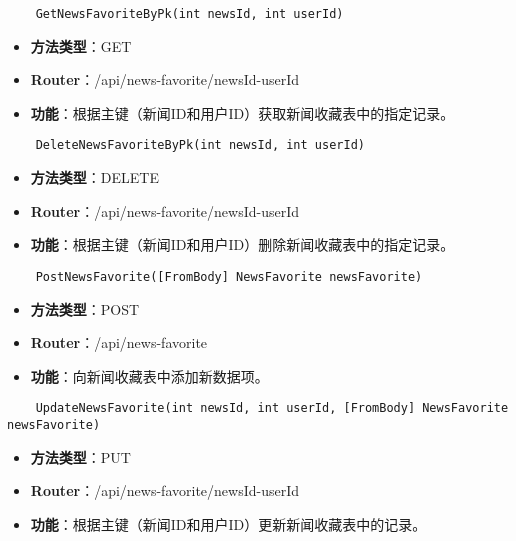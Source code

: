 \begin{verbatim}
	GetNewsFavoriteByPk(int newsId, int userId)
\end{verbatim}

\begin{itemize}
	\item \textbf{方法类型}：GET
	\item \textbf{Router}：/api/news-favorite/{newsId}-{userId}
	\item \textbf{功能}：根据主键（新闻ID和用户ID）获取新闻收藏表中的指定记录。
\end{itemize}

\begin{verbatim}
	DeleteNewsFavoriteByPk(int newsId, int userId)
\end{verbatim}

\begin{itemize}
	\item \textbf{方法类型}：DELETE
	\item \textbf{Router}：/api/news-favorite/{newsId}-{userId}
	\item \textbf{功能}：根据主键（新闻ID和用户ID）删除新闻收藏表中的指定记录。
\end{itemize}

\begin{verbatim}
	PostNewsFavorite([FromBody] NewsFavorite newsFavorite)
\end{verbatim}

\begin{itemize}
	\item \textbf{方法类型}：POST
	\item \textbf{Router}：/api/news-favorite
	\item \textbf{功能}：向新闻收藏表中添加新数据项。
\end{itemize}

\begin{verbatim}
	UpdateNewsFavorite(int newsId, int userId, [FromBody] NewsFavorite newsFavorite)
\end{verbatim}

\begin{itemize}
	\item \textbf{方法类型}：PUT
	\item \textbf{Router}：/api/news-favorite/{newsId}-{userId}
	\item \textbf{功能}：根据主键（新闻ID和用户ID）更新新闻收藏表中的记录。
\end{itemize}

